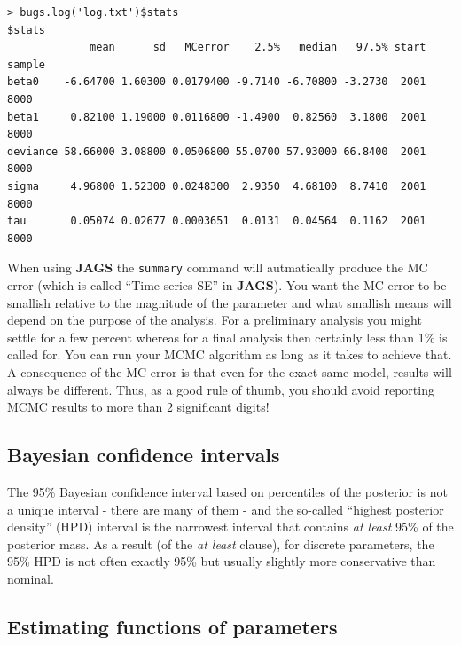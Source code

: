 {\small
\begin{verbatim}
> bugs.log('log.txt')$stats
$stats
             mean      sd   MCerror    2.5%   median   97.5% start sample
beta0    -6.64700 1.60300 0.0179400 -9.7140 -6.70800 -3.2730  2001   8000
beta1     0.82100 1.19000 0.0116800 -1.4900  0.82560  3.1800  2001   8000
deviance 58.66000 3.08800 0.0506800 55.0700 57.93000 66.8400  2001   8000
sigma     4.96800 1.52300 0.0248300  2.9350  4.68100  8.7410  2001   8000
tau       0.05074 0.02677 0.0003651  0.0131  0.04564  0.1162  2001   8000
\end{verbatim}
}
  When using {\bf JAGS} the \mbox{\tt summary} command will autmatically produce the MC error (which is called ``Time-series SE'' in {\bf
  JAGS}). You want the MC error to be smallish relative to the magnitude of
the parameter and what smallish means will depend on the purpose of
the analysis. For a preliminary analysis you might settle for a few
percent whereas for a final analysis then certainly less than 1\% is
called for. You can run your MCMC algorithm as long as it takes to
achieve that. A consequence of the MC error is that even for the exact
same model, results will always be different. Thus, as a good rule of
thumb, you should avoid reporting MCMC results to more than 2
significant digits!

\subsection{Bayesian confidence intervals}

The 95\% Bayesian confidence interval based on percentiles of the
posterior is not a unique interval - there are many of them - and the
so-called ``highest posterior density'' (HPD) interval is the
narrowest interval that contains {\it at least} 95\% of the posterior
mass.  As a result (of the {\it at least} clause), for discrete
parameters, the 95\% HPD is not often exactly 95\% but usually
slightly more conservative than nominal.

\subsection{Estimating functions of parameters}

